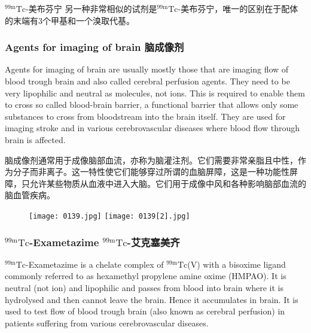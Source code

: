 \documentclass[dvipsnames, svgnames,a4paper,11pt]{article}
\begin{document}
${}^\mathrm{99m}\mathrm{Tc}$-美布芬宁 另一种非常相似的试剂是${}^\mathrm{99m}\mathrm{Tc}$-美布芬宁，唯一的区别在于配体的末端有3个甲基和一个溴取代基。

\subsubsection{Agents for imaging of brain 脑成像剂}

Agents for imaging of brain are usually mostly those that are imaging flow of blood
trough brain and also called cerebral perfusion agents. They need to be very
lipophilic and neutral as molecules, not ions. This is required to enable them to cross
so called blood-brain barrier, a functional barrier that allows only some substances to
cross from bloodstream into the brain itself. They are used for imaging stroke and in
various cerebrovascular diseases where blood flow through brain is affected.

脑成像剂通常用于成像脑部血流，亦称为脑灌注剂。它们需要非常亲脂且中性，作为分子而非离子。这一特性使它们能够穿过所谓的血脑屏障，这是一种功能性屏障，只允许某些物质从血液中进入大脑。它们用于成像中风和各种影响脑部血流的脑血管疾病。

\begin{figure}[h]
	\centering
    \texttt{[image: 0139.jpg]}    
    \hspace{0.1in}
    \texttt{[image: 0139[2].jpg]} 
     \label{fig145}
\end{figure}


\subsubsection{${}^\mathrm{99m}\mathrm{Tc}$-Exametazime ${}^\mathrm{99m}\mathrm{Tc}$-艾克塞美齐}

${}^\mathrm{99m}\mathrm{Tc}$-Exametazime is a chelate complex of ${}^\mathrm{99m}\mathrm{Tc}$(V) with a bisoxime ligand
commonly referred to as hexamethyl propylene amine oxime (HMPAO). It is neutral
(not ion) and lipophilic and passes from blood into brain where it is hydrolysed and
then cannot leave the brain. Hence it accumulates in brain. It is used to test flow of
blood trough brain (also known as cerebral perfusion) in patients suffering from
various cerebrovascular diseases.
\end{document}
